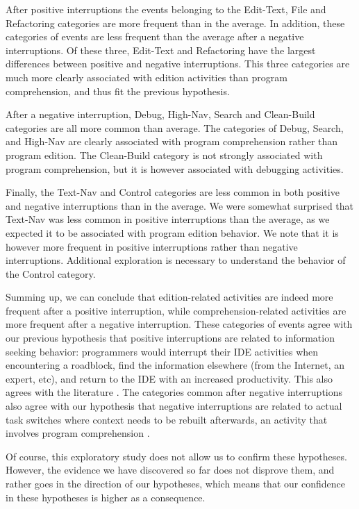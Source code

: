 After positive interruptions the events belonging to the Edit-Text, File and Refactoring categories are more frequent than in the average. In addition, these categories of events are less frequent than the average after a negative interruptions. Of these three, Edit-Text and Refactoring have the largest differences between positive and negative interruptions. This three categories are much more clearly associated with edition activities than program comprehension, and thus fit the previous hypothesis.

After a negative interruption, Debug, High-Nav, Search and Clean-Build categories are all more common than average. The categories of Debug, Search, and High-Nav are clearly associated with program comprehension rather than program edition. The Clean-Build category is not strongly associated with program comprehension, but it is however associated with debugging activities. 

Finally, the Text-Nav and Control categories are less common in both positive and negative interruptions than in the average. We were somewhat surprised that Text-Nav was less common in positive interruptions than the average, as we expected it to be associated with program edition behavior. We note that it is however more frequent in positive interruptions rather than negative interruptions. Additional exploration is necessary to understand the behavior of the Control category.

Summing up, we can conclude that edition-related activities are indeed more frequent after a positive interruption, while comprehension-related activities are more frequent after a negative interruption.  These categories of events agree with our previous hypothesis that positive interruptions are related to information seeking behavior: programmers would interrupt their IDE activities when encountering a roadblock, find the information elsewhere (from the Internet, an expert, etc), and return to the IDE with an increased productivity. This also agrees with the literature \cite{PR11, LVD06}. The categories common after negative interruptions also agree with our hypothesis that negative interruptions are related to actual task switches where context needs to be rebuilt afterwards, an activity that involves program comprehension \cite{MMLK14, PR12}. %

Of course, this exploratory study does not allow us to confirm these hypotheses. However, the evidence we have discovered so far does not disprove them, and rather goes in the direction of our hypotheses, which means that our confidence in these hypotheses is higher as a consequence.

